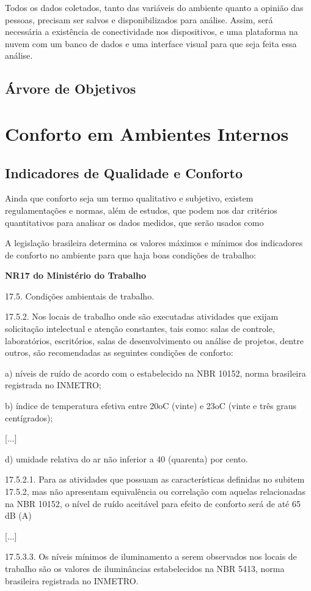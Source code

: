 \documentclass[]{politex}
\begin{document}
Todos os dados coletados, tanto das variáveis do ambiente quanto a opinião das pessoas, precisam ser salvos e disponibilizados para análise. Assim, será necessária a existência de conectividade nos dispositivos, e uma plataforma na nuvem com um banco de dados e uma interface visual para que seja feita essa análise. 

\chapter{Árvore de Objetivos} 

\part{Conforto em Ambientes Internos} %

\chapter{Indicadores de Qualidade e Conforto} %

Ainda que conforto seja um termo qualitativo e subjetivo, existem regulamentações e normas, além de estudos, que podem nos dar critérios quantitativos para analisar os dados medidos, que serão usados como %

A legislação brasileira determina os valores máximos e mínimos dos indicadores de conforto no ambiente para que haja boas condições de trabalho: 

\begin{citacaoLonga} %
\textbf{NR17 do Ministério do Trabalho} \cite{NR17}

17.5. Condições ambientais de trabalho.

17.5.2. Nos locais de trabalho onde são executadas atividades que exijam solicitação intelectual e atenção constantes, tais como: salas de controle, laboratórios, escritórios, salas de desenvolvimento ou análise de projetos, dentre outros, são recomendadas as seguintes condições de conforto:

a) níveis de ruído de acordo com o estabelecido na NBR 10152, norma brasileira registrada no INMETRO;

b) índice de temperatura efetiva entre 20oC (vinte) e 23oC (vinte e três graus centígrados);

[...]

d) umidade relativa do ar não inferior a 40 (quarenta) por cento.

17.5.2.1. Para as atividades que possuam as características definidas no subitem 17.5.2, mas não apresentam equivalência ou correlação com aquelas relacionadas na NBR 10152, o nível de ruído aceitável para efeito de conforto será de até 65 dB (A)

[...]

17.5.3.3. Os níveis mínimos de iluminamento a serem observados nos locais de trabalho são os valores de iluminâncias estabelecidos na NBR 5413, norma brasileira registrada no INMETRO.
\end{citacaoLonga}
\end{document}
